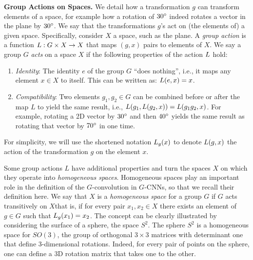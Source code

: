 

\textbf{Group Actions on Spaces.} We detail how a transformation $g$ can transform elements of a space, for example how a rotation of $30\degree$ indeed rotates a vector in the plane by $30\degree$. We say that the transformations $g$'s act on (the elements of) a given space. Specifically, consider $X$ a space, such as the plane. A \textit{group action} is a function $L: G \times X \rightarrow X$ that maps $(g, x)$ pairs to elements of $X$. We say a group $G$ \textit{acts} on a space $X$ if the following properties of the action $L$ hold:
\begin{enumerate}
    \item \textit{Identity}: The identity $e$ of the group $G$ ``does nothing'', i.e., it maps any element $x \in X$ to itself. This can be written as: $L(e, x) = x$.
    \item \textit{Compatibility}: Two elements $g_1, g_2 \in G$ can be combined before or after the map $L$ to yield the same result, i.e., $L(g_1, L(g_2, x)) = L(g_1 g_2, x)$. For example, rotating a 2D vector by $30\degree$ and then $40\degree$ yields the same result as rotating that vector by $70\degree$ in one time.
\end{enumerate}
For simplicity, we will use the shortened notation $L_g(x)$ to denote $L(g, x)$ the action of the transformation $g$ on the element $x$.

Some group actions $L$ have additional properties and turn the spaces $X$ on which they operate into \textit{homogeneous spaces}. Homogeneous spaces play an important role in the definition of the $G$-convolution in $G$-CNNs, so that we recall their definition here. We say that $X$ is a \textit{homogeneous space} for a group $G$ if $G$ acts transitively on $X$\textemdash that is, if for every pair $x_1, x_2 \in X$ there exists an element of $g \in G$ such that $L_g(x_1) = x_2$. The concept can be clearly illustrated by considering the surface of a sphere, the space $S^2$. The sphere $S^2$ is a homogeneous space for $SO(3)$, the group of orthogonal $3 \times 3$ matrices with determinant one that define 3-dimensional rotations.  Indeed, for every pair of points on the sphere, one can define a 3D rotation matrix that takes one to the other.

